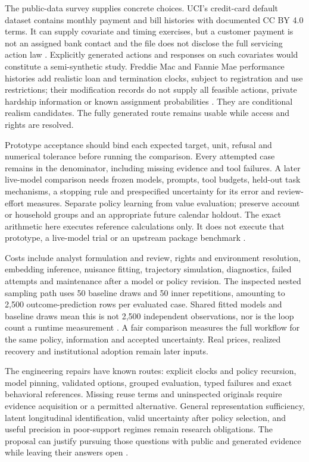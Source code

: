 The public-data survey supplies concrete choices. UCI's credit-card
default dataset contains monthly payment and bill histories with
documented CC BY 4.0 terms. It can supply covariate and timing exercises,
but a customer payment is not an assigned bank contact and the file
does not disclose the full servicing action law
\citep{pd15_uci_credit}. Explicitly generated actions and responses on
such covariates would constitute a semi-synthetic study.
Freddie Mac and Fannie Mae performance histories add realistic loan
and termination clocks, subject to registration and use restrictions;
their modification records do not supply all feasible actions,
private hardship information or known assignment probabilities
\citep{pd15_freddie,pd15_fannie}. They are conditional realism
candidates. The fully generated route remains usable while access and
rights are resolved.

Prototype acceptance should bind each expected target, unit, refusal
and numerical tolerance before running the comparison. Every attempted
case remains in the denominator, including missing evidence and tool
failures. A later live-model comparison needs frozen models, prompts,
tool budgets, held-out task mechanisms, a stopping rule and
prespecified uncertainty for its error and review-effort measures.
Separate policy learning from value evaluation; preserve account or
household groups and an appropriate future calendar holdout.
The exact arithmetic here executes reference calculations only. It
does not execute that prototype, a live-model trial or an upstream
package benchmark \citep{exec16_longpolicy_design}.

Costs include analyst formulation and review, rights and environment
resolution, embedding inference, nuisance fitting, trajectory
simulation, diagnostics, failed attempts and maintenance after a
model or policy revision. The inspected nested sampling path uses
50 baseline draws and 50 inner repetitions, amounting to 2,500
outcome-prediction rows per evaluated case. Shared fitted models and
baseline draws mean this is not 2,500 independent observations, nor is
the loop count a runtime measurement
\citep{exec16_longpolicy_code,exec16_longpolicy_oracle}.
A fair comparison measures the full workflow for the same policy,
information and accepted uncertainty. Real prices, realized recovery
and institutional adoption remain later inputs.

The engineering repairs have known routes: explicit clocks and policy
recursion, model pinning, validated options, grouped evaluation,
typed failures and exact behavioral references. Missing reuse terms
and uninspected originals require evidence acquisition or a permitted
alternative. General representation sufficiency, latent longitudinal
identification, valid uncertainty after policy selection, and useful
precision in poor-support regimes remain research obligations.
The proposal can justify pursuing those questions with public and
generated evidence while leaving their answers open
\citep{exec16_longpolicy_design}.
\label{exec16:longitudinal-policy-end}
